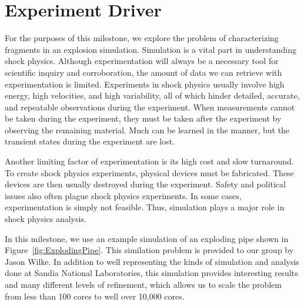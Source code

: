 \section{Experiment Driver}
\label{sec:UseCase}

For the purposes of this milestone, we explore the problem of
characterizing fragments in an explosion simulation.  Simulation is a vital
part in understanding shock physics.  Although experimentation will always
be a necessary tool for scientific inquiry and corroboration, the amount of
data we can retrieve with experimentation is limited.  Experiments in shock
physics usually involve high energy, high velocities, and high variability,
all of which hinder detailed, accurate, and repeatable observations during
the experiment.  When measurements cannot be taken during the experiment,
they must be taken after the experiment by observing the remaining
material.  Much can be learned in the manner, but the transient states
during the experiment are lost.

Another limiting factor of experimentation is its high cost and slow
turnaround.  To create shock physics experiments, physical devices must be
fabricated.  These devices are then usually destroyed during the
experiment.  Safety and political issues also often plague shock physics
experiments.  In some cases, experimentation is simply not feasible.  Thus,
simulation plays a major role in shock physics analysis.

In this milestone, we use an example simulation of an exploding pipe shown
in Figure~\ref{fig:ExplodingPipe}.  This similation problem is provided to
our group by Jason Wilke.  In addition to well representing the kinds of
simulation and analysis done at Sandia National Laboratories, this
simulation provides interesting results and many different levels of
refinement, which allows us to scale the problem from less than 100 cores
to well over 10,000 cores.

